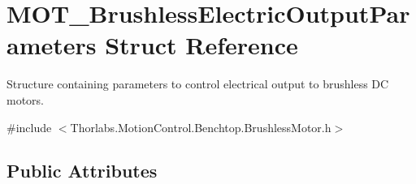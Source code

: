\hypertarget{struct_m_o_t___brushless_electric_output_parameters}{}\section{M\+O\+T\+\_\+\+Brushless\+Electric\+Output\+Parameters Struct Reference}
\label{struct_m_o_t___brushless_electric_output_parameters}


Structure containing parameters to control electrical output to brushless DC motors.  




{\ttfamily \#include $<$Thorlabs.\+Motion\+Control.\+Benchtop.\+Brushless\+Motor.\+h$>$}

\subsection*{Public Attributes}

